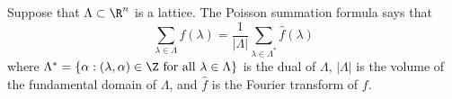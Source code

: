 \documentclass [preview, border = 20pt] {standalone}
\begin{document}
\pagecolor{black}
\color{white}
Suppose that $\Lambda\subset \R^n$ is a lattice. The Poisson summation formula says that
\[
\sum_{\lambda\in\Lambda} f(\lambda) = \frac{1}{|{\Lambda}|} \sum_{\lambda\in \Lambda^*} \widehat f(\lambda)
\]
where $\Lambda^* =\{ \alpha : \textrm{$(\lambda,\alpha)\in \Z$ for all $\lambda\in \Lambda$}\}$ is the dual of $\Lambda$, $|\Lambda|$ is the volume of the fundamental domain of $\Lambda$, and $\widehat f$ is the Fourier transform of $f$.
\end{document}
